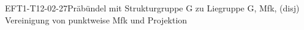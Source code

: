 
\begin{REM}{EFT1-T12-02-27}{Präbündel mit Strukturgruppe G zu Liegruppe G, Mfk, (disj) Vereinigung von punktweise Mfk und Projektion}
\end{REM}
